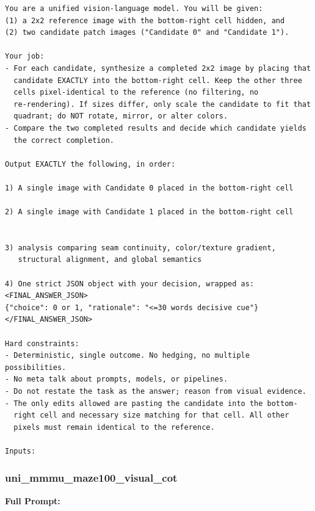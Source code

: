 \documentclass{article}
\theoremstyle{plain}
\theoremstyle{definition}
\theoremstyle{remark}
\begin{document}
\begin{verbatim}
You are a unified vision-language model. You will be given:
(1) a 2x2 reference image with the bottom-right cell hidden, and
(2) two candidate patch images ("Candidate 0" and "Candidate 1").

Your job:
- For each candidate, synthesize a completed 2x2 image by placing that
  candidate EXACTLY into the bottom-right cell. Keep the other three
  cells pixel-identical to the reference (no filtering, no
  re-rendering). If sizes differ, only scale the candidate to fit that
  quadrant; do NOT rotate, mirror, or alter colors.
- Compare the two completed results and decide which candidate yields
  the correct completion.

Output EXACTLY the following, in order:

1) A single image with Candidate 0 placed in the bottom-right cell

2) A single image with Candidate 1 placed in the bottom-right cell


3) analysis comparing seam continuity, color/texture gradient,
   structural alignment, and global semantics

4) One strict JSON object with your decision, wrapped as:
<FINAL_ANSWER_JSON>
{"choice": 0 or 1, "rationale": "<=30 words decisive cue"}
</FINAL_ANSWER_JSON>

Hard constraints:
- Deterministic, single outcome. No hedging, no multiple possibilities.
- No meta talk about prompts, models, or pipelines.
- Do not restate the task as the answer; reason from visual evidence.
- The only edits allowed are pasting the candidate into the bottom-
  right cell and necessary size matching for that cell. All other
  pixels must remain identical to the reference.

Inputs:
\end{verbatim}

\subsubsection{uni\_mmmu\_maze100\_visual\_cot}

\textbf{Full Prompt:}
\end{document}
